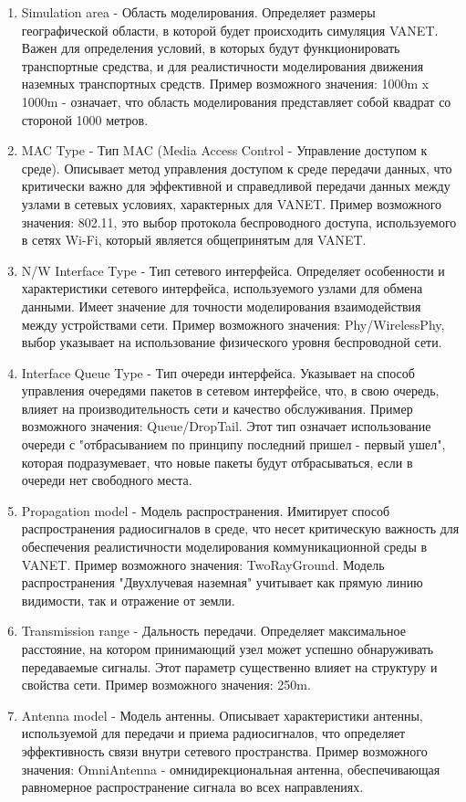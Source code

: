 \begin{enumerate}
  \item Simulation area - Область моделирования. Определяет размеры географической области, в которой будет происходить симуляция VANET. Важен для определения условий, в которых будут функционировать транспортные средства, и для реалистичности моделирования движения наземных транспортных средств. Пример возможного значения: 1000m x 1000m - означает, что область моделирования представляет собой квадрат со стороной 1000 метров.
  \item MAC Type - Тип MAC (Media Access Control - Управление доступом к среде). Описывает метод управления доступом к среде передачи данных, что критически важно для эффективной и справедливой передачи данных между узлами в сетевых условиях, характерных для VANET. Пример возможного значения: 802.11, это выбор протокола беспроводного доступа, используемого в сетях Wi-Fi, который является общепринятым для VANET.
  \item N/W Interface Type - Тип сетевого интерфейса. Определяет особенности и характеристики сетевого интерфейса, используемого узлами для обмена данными. Имеет значение для точности моделирования взаимодействия между устройствами сети. Пример возможного значения: Phy/WirelessPhy, выбор указывает на использование физического уровня беспроводной сети.
  \item Interface Queue Type - Тип очереди интерфейса. Указывает на способ управления очередями пакетов в сетевом интерфейсе, что, в свою очередь, влияет на производительность сети и качество обслуживания. Пример возможного значения: Queue/DropTail. Этот тип означает использование очереди с "отбрасыванием по принципу последний пришел - первый ушел", которая подразумевает, что новые пакеты будут отбрасываться, если в очереди нет свободного места.
  \item Propagation model - Модель распространения. Имитирует способ распространения радиосигналов в среде, что несет критическую важность для обеспечения реалистичности моделирования коммуникационной среды в VANET. Пример возможного значения: TwoRayGround. Модель распространения "Двухлучевая наземная" учитывает как прямую линию видимости, так и отражение от земли.
  \item Transmission range - Дальность передачи. Определяет максимальное расстояние, на котором принимающий узел может успешно обнаруживать передаваемые сигналы. Этот параметр существенно влияет на структуру и свойства сети. Пример возможного значения: 250m.
  \item Antenna model - Модель антенны. Описывает характеристики антенны, используемой для передачи и приема радиосигналов, что определяет эффективность связи внутри сетевого пространства. Пример возможного значения: OmniAntenna - омнидирекциональная антенна, обеспечивающая равномерное распространение сигнала во всех направлениях.

\end{enumerate}
